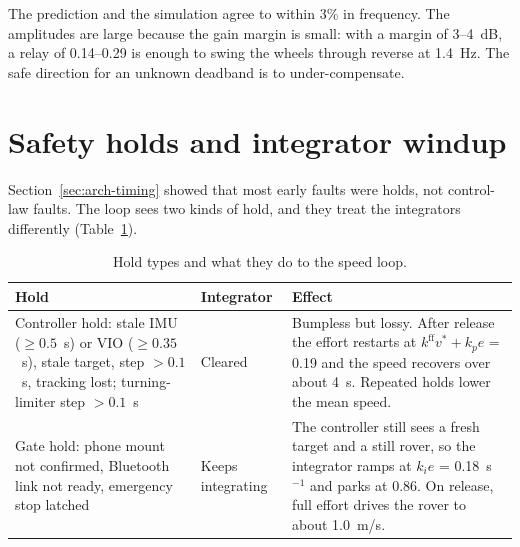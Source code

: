 The prediction and the simulation agree to within 3\% in frequency.
The amplitudes are large because the gain margin is small: with a margin of 3--4~dB, a relay of 0.14--0.29 is enough to swing the wheels through reverse at 1.4~Hz.
The safe direction for an unknown deadband is to under-compensate.

\section{Safety holds and integrator windup}
\label{sec:stab-holds}

Section~\ref{sec:arch-timing} showed that most early faults were holds, not control-law faults.
The loop sees two kinds of hold, and they treat the integrators differently (Table~\ref{tab:stab-holds}).

\begin{table}[ht]
\centering
\caption{Hold types and what they do to the speed loop.}
\label{tab:stab-holds}
\small
\begin{tabularx}{\textwidth}{@{}>{\raggedright\arraybackslash}p{} >{\raggedright\arraybackslash}p{} X@{}}
\toprule
Hold & Integrator & Effect \\
\midrule
Controller hold: stale IMU ($\ge 0.5$~s) or VIO ($\ge 0.35$~s), stale target, step $> 0.1$~s, tracking lost; turning-limiter step $> 0.1$~s & Cleared & Bumpless but lossy. After release the effort restarts at $k^{\text{ff}}v^\ast + k_p e$ = 0.19 and the speed recovers over about 4~s. Repeated holds lower the mean speed. \\
Gate hold: phone mount not confirmed, Bluetooth link not ready, emergency stop latched & Keeps integrating & The controller still sees a fresh target and a still rover, so the integrator ramps at $k_i e$ = 0.18~s$^{-1}$ and parks at 0.86. On release, full effort drives the rover to about 1.0~m/s. \\
\bottomrule
\end{tabularx}
\end{table}

